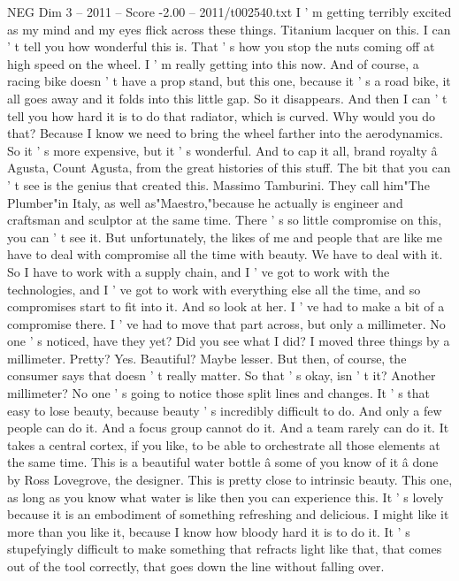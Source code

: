 \begin{textsample}{NEG Dim 3 – 2011 – Score -2.00 – 2011/t002540.txt}
I ' m getting terribly excited as my mind and my eyes flick across these things.
Titanium lacquer on this.
I can ' t tell you how wonderful this is.
That ' s how you stop the nuts coming off at high speed on the wheel.
I ' m really getting into this now.
And of course, a racing bike doesn ' t have a prop stand, but this one, because it ' s a road bike, it all goes away and it folds into this little gap.
So it disappears.
And then I can ' t tell you how hard it is to do that radiator, which is curved.
Why would you do that?
Because I know we need to bring the wheel farther into the aerodynamics.
So it ' s more expensive, but it ' s wonderful.
And to cap it all, brand royalty â Agusta, Count Agusta, from the great histories of this stuff.
The bit that you can ' t see is the genius that created this.
Massimo Tamburini.
They call him"The Plumber"in Italy, as well as"Maestro,"because he actually is engineer and craftsman and sculptor at the same time.
There ' s so little compromise on this, you can ' t see it.
But unfortunately, the likes of me and people that are like me have to deal with compromise all the time with beauty.
We have to deal with it.
So I have to work with a supply chain, and I ' ve got to work with the technologies, and I ' ve got to work with everything else all the time, and so compromises start to fit into it.
And so look at her.
I ' ve had to make a bit of a compromise there.
I ' ve had to move that part across, but only a millimeter.
No one ' s noticed, have they yet?
Did you see what I did?
I moved three things by a millimeter.
Pretty?
Yes.
Beautiful?
Maybe lesser.
But then, of course, the consumer says that doesn ' t really matter.
So that ' s okay, isn ' t it?
Another millimeter?
No one ' s going to notice those split lines and changes.
It ' s that easy to lose beauty, because beauty ' s incredibly difficult to do.
And only a few people can do it.
And a focus group cannot do it.
And a team rarely can do it.
It takes a central cortex, if you like, to be able to orchestrate all those elements at the same time.
This is a beautiful water bottle â some of you know of it â done by Ross Lovegrove, the designer.
This is pretty close to intrinsic beauty.
This one, as long as you know what water is like then you can experience this.
It ' s lovely because it is an embodiment of something refreshing and delicious.
I might like it more than you like it, because I know how bloody hard it is to do it.
It ' s stupefyingly difficult to make something that refracts light like that, that comes out of the tool correctly, that goes down the line without falling over.

\end{textsample}
